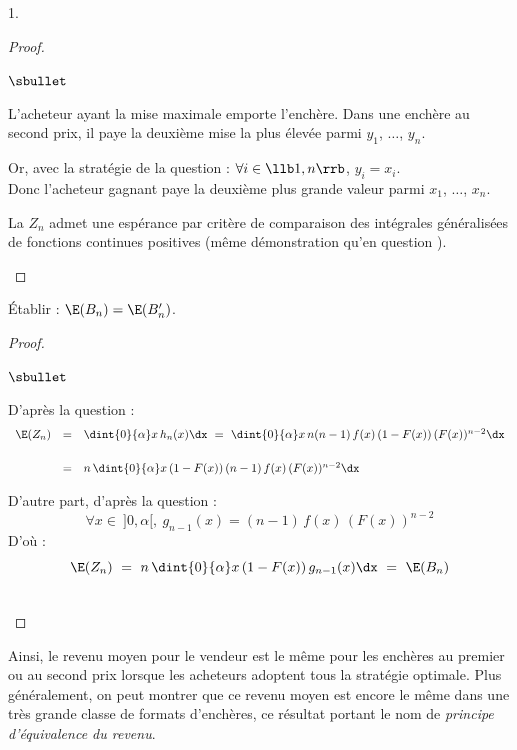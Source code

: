 \begin{noliste}{1.}
  \begin{proof}~
   \begin{noliste}{$\sbullet$}
    \item L'acheteur ayant la mise maximale emporte l'enchère. Dans une 
    enchère au second prix, il paye la deuxième mise la plus élevée
    parmi $y_1$, $\ldots$, $y_n$.
    
    
    \newpage
    
    
    \item Or, avec la stratégie de la question  : 
    $\forall i \in \llb 1, n \rrb$, $y_i=x_i$.\\[.2cm]
    Donc l'acheteur gagnant paye la deuxième plus grande valeur parmi
    $x_1$, $\ldots$, $x_n$.
    
    
    
    \item La \var $Z_n$ admet une espérance par critère de comparaison 
    des intégrales généralisées de fonctions continues positives (même 
    démonstration qu'en question ).
    ~\\[-1.4cm]
   \end{noliste}
  \end{proof}

  
  \item Établir : $\E(B_n) = \E(B_n')$.
  
  \begin{proof}~
    \begin{noliste}{$\sbullet$}
      \item D'après la question  : 
      \[
       \begin{array}{rcl}
        \E(Z_n) & = & \dint{0}{\alpha} x \, h_n(x) \dx \ = \
        \dint{0}{\alpha} x \, n(n-1) \, f(x) \, (1-F(x)) \, (F(x))^{n-2}
        \dx
        \\[.6cm]
        & = & n \, \dint{0}{\alpha} x \, (1-F(x)) \, (n-1) \, f(x) \,
        (F(x))^{n-2} \dx
       \end{array}
      \]
      
      \item D'autre part, d'après la question  : 
      \[
        \forall x \in \ ]0, \alpha[, \ g_{n-1}(x) = (n-1) \, f(x) \,
        (F(x))^{n-2}
      \]
      D'où :
      \[
        \E(Z_n) \ = \ n \, \dint{0}{\alpha} x \, (1-F(x)) \, g_{n-1}(x)
        \dx \ = \ \E(B_n)
      \]
    \end{noliste}
    ~\\[-1cm]
  \end{proof}
\end{noliste}
Ainsi, le revenu moyen pour le vendeur est le même pour les enchères au 
premier ou au second prix lorsque les acheteurs adoptent tous la 
stratégie optimale. Plus généralement, on peut montrer que ce revenu 
moyen est encore le même dans une très grande classe de formats 
d'enchères, ce résultat portant le nom de \emph{principe d'équivalence 
du revenu}.






